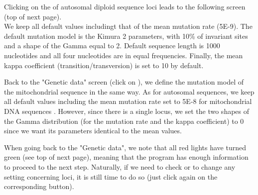 
Clicking on the  of autosomal diploid sequence loci leads to the following screen (top of next page).\\
 We keep all default values includingt that of the mean mutation rate (5E-9). The default mutation model is the Kimura 2 parameters, with 10\% of invariant sites and a shape of the Gamma equal to 2. Default sequence length is 1000 nucleotides and all four nucleotides are in equal frequencies. Finally, the mean kappa coefficient (transition/transversion) is set to 10 by default.

\newpage


Back to the "Genetic data" screen (click on ), we define the mutation model of the mitochondrial sequence in the same way. As for autosomal sequences, we keep all default values including the mean mutation rate set to 5E-8 for mitochondrial DNA sequences \citep{HL2008}. However, since there is a single locus, we set the two shapes of the Gamma distribution (for the mutation rate and the kappa coefficient)  to 0 since we want its parameters identical to the mean values.


When going back to the "Genetic data", we note that all red lights have turned green (see top of next page), meaning that the program has enough information to proceed to the next step. Naturally, if we need to check or to change any setting concerning loci, it is still time to do so (just click again on the corresponding  button).\\

\newpage


